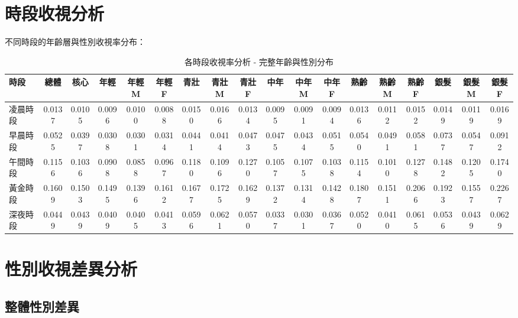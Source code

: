 \documentclass[11pt,a4paper]{article}
\begin{document}
\section{時段收視分析}

不同時段的年齡層與性別收視率分布：

\begin{table}[H]
\fontsize{5}{6}\selectfont
\centering
\caption{各時段收視率分析 - 完整年齡與性別分布}
\setlength{\tabcolsep}{1pt}
\begin{adjustbox}{width=\textwidth,center}
\begin{tabular}{@{}l*{17}{c}@{}}
\toprule
\textbf{時段} & \textbf{總體} & \textbf{核心} & \textbf{年輕} & \textbf{年輕M} & \textbf{年輕F} & \textbf{青壯} & \textbf{青壯M} & \textbf{青壯F} & \textbf{中年} & \textbf{中年M} & \textbf{中年F} & \textbf{熟齡} & \textbf{熟齡M} & \textbf{熟齡F} & \textbf{銀髮} & \textbf{銀髮M} & \textbf{銀髮F} \\
\midrule
凌晨時段 & 0.0137 & 0.0105 & 0.0096 & 0.0100 & 0.0088 & 0.0150 & 0.0166 & 0.0134 & 0.0095 & 0.0091 & 0.0094 & 0.0136 & 0.0112 & 0.0152 & 0.0149 & 0.0119 & 0.0169 \\
早晨時段 & 0.0525 & 0.0397 & 0.0308 & 0.0301 & 0.0314 & 0.0441 & 0.0414 & 0.0473 & 0.0475 & 0.0434 & 0.0515 & 0.0540 & 0.0491 & 0.0581 & 0.0737 & 0.0547 & 0.0912 \\
午間時段 & 0.1156 & 0.1036 & 0.0908 & 0.0858 & 0.0967 & 0.1180 & 0.1096 & 0.1270 & 0.1057 & 0.1075 & 0.1038 & 0.1154 & 0.1010 & 0.1278 & 0.1482 & 0.1205 & 0.1740 \\
黃金時段 & 0.1609 & 0.1503 & 0.1495 & 0.1396 & 0.1612 & 0.1677 & 0.1725 & 0.1629 & 0.1372 & 0.1314 & 0.1428 & 0.1807 & 0.1511 & 0.2066 & 0.1923 & 0.1557 & 0.2267 \\
深夜時段 & 0.0449 & 0.0439 & 0.0409 & 0.0405 & 0.0413 & 0.0596 & 0.0621 & 0.0570 & 0.0337 & 0.0301 & 0.0367 & 0.0520 & 0.0410 & 0.0615 & 0.0536 & 0.0439 & 0.0629 \\

\bottomrule
\end{tabular}
\end{adjustbox}
\end{table}

\section{性別收視差異分析}

\subsection{整體性別差異}
\end{document}
